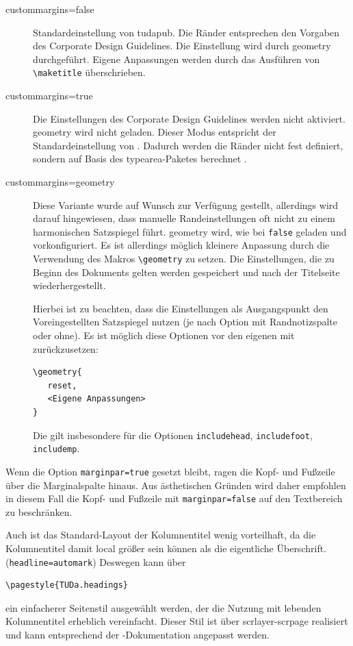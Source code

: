 \documentclass[
	ngerman,%
	accentcolor=9c,%
	ruledheaders=section,%
	class=report,%
	thesis={type=bachelor},%
	fontsize=11pt,%
	parskip=half-,%
	custommargins=true,%
	marginpar=false,%
]{tudapub}
\newcommand*{\code}[1]{\texttt{#1}}
\newcommand*{\pkg}[1]{\textsf{#1}}
\newcommand*{\cls}[1]{\textsf{#1}}
\begin{document}
\begin{description}
	\item[custommargins=false] Standardeinstellung von \cls{tudapub}. Die Ränder entsprechen den Vorgaben des Corporate Design Guidelines. Die Einstellung wird durch \pkg{geometry} durchgeführt. Eigene Anpassungen werden durch das Ausführen von \code{\textbackslash{}maketitle} überschrieben.
	\item[custommargins=true] Die Einstellungen des Corporate Design Guidelines werden nicht aktiviert. \pkg{geometry} wird nicht geladen. Dieser Modus entspricht der Standardeinstellung von \KOMAScript{}. Dadurch werden die Ränder nicht fest definiert, sondern auf Basis des \pkg{typearea}-Paketes berechnet \cite[vgl.][]{scrguide}.
	\item[custommargins=geometry]  Diese Variante wurde auf Wunsch zur Verfügung gestellt, allerdings wird darauf hingewiesen, dass manuelle Randeinstellungen oft nicht zu einem harmonischen Satzspiegel führt.
	      \pkg{geometry} wird, wie bei \code{false} geladen und vorkonfiguriert. Es ist allerdings möglich kleinere Anpassung durch die Verwendung des Makros \code{\textbackslash{}geometry} zu setzen. Die Einstellungen, die zu Beginn des Dokuments gelten werden gespeichert und nach der Titelseite wiederhergestellt.

	      Hierbei ist zu beachten, dass die Einstellungen als Ausgangspunkt den Voreingestellten Satzspiegel nutzen (je nach Option mit Randnotizspalte oder ohne). Es ist möglich diese Optionen vor den eigenen mit zurückzusetzen:
\begin{verbatim}
\geometry{
   reset,
   <Eigene Anpassungen>
}
\end{verbatim}
	      Die gilt insbesondere für die Optionen \code{includehead}, \code{includefoot}, \code{includemp}.
\end{description}

Wenn die Option \code{marginpar=true} gesetzt bleibt, ragen die Kopf- und Fußzeile über die Marginalspalte hinaus. Aus ästhetischen Gründen wird daher empfohlen in diesem Fall die Kopf- und Fußzeile  mit \code{marginpar=false}  auf den Textbereich zu beschränken.

Auch ist das Standard-Layout der Kolumnentitel wenig vorteilhaft, da die Kolumnentitel damit local größer sein können als die eigentliche Überschrift. (\code{headline=automark})
Deswegen kann über
\begin{verbatim}
\pagestyle{TUDa.headings}
\end{verbatim}
ein einfacherer Seitenstil ausgewählt werden, der die Nutzung mit lebenden Kolumnentitel erheblich vereinfacht. Dieser Stil ist über \pkg{scrlayer-scrpage} realisiert und kann entsprechend der \KOMAScript{}-Dokumentation angepasst werden.
\end{document}
